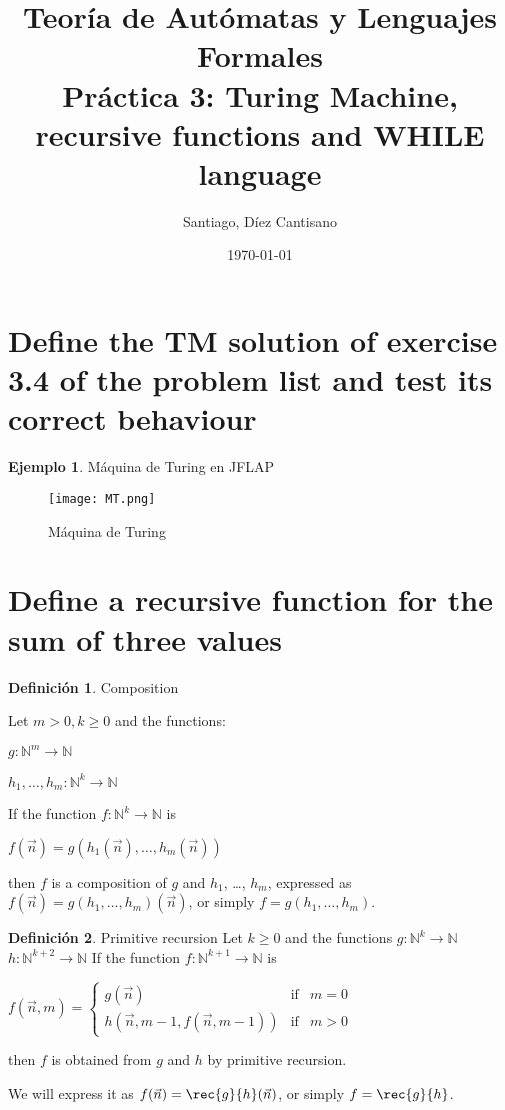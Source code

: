 \documentclass{article}
\title{Teoría de Autómatas y Lenguajes Formales\\[.4\baselineskip]Práctica 3: Turing Machine, recursive functions and WHILE language}
\author{Santiago, Díez Cantisano}
\date{\today}
\theoremstyle{plain}
\theoremstyle{definition}
\newtheorem{definition}{Definición}[section]
\newtheorem{example}{Ejemplo}[section]
\begin{document}
\maketitle

\section{Define the TM solution of exercise 3.4 of the problem list and test its correct behaviour}

\begin{example}
Máquina de Turing en JFLAP
\begin{figure}
    \centering
    \texttt{[image: MT.png]}
    \caption{Máquina de Turing}
    \label{fig:my_label}
\end{figure}
\end{example}

\newpage
\section{Define a recursive function for the sum of three values}

\begin{definition}{Composition }

Let $m>0, k\geq0 $ and the functions: 

$g:\mathbb{N}^m \to \mathbb{N}$

$h_1, \dots, h_m: \mathbb{N}^k \to \mathbb{N}$

If the function $f:\mathbb{N}^k\to \mathbb{N}$ is
\begin{center}
    $f(\vec{n})=g(h_1(\vec{n}), \dots, h_m(\vec{n})) $
\end{center}
then $f$ is a composition of $g$ and $h_1$, \dots, $h_m$, 
expressed as $f(\vec{n})=g(h_1, \dots, h_m)(\vec{n})$, or simply $f=g(h_1, \dots, h_m)$.
\end{definition}

\begin{definition}{Primitive recursion }
\newline Let $k\geq 0$ and the functions
\newline $g:\mathbb{N}^k \to \mathbb{N}$
\newline $h:\mathbb{N}^{k+2} \to \mathbb{N}$
\newline If the function $f:\mathbb{N}^{k+1} \to \mathbb{N}$ is
\begin{center}
    $f(\vec{n},m)=\left\{ 
\begin{array}{lcc}
    g(\vec{n})                          & \text{if} & m=0\\
    h(\vec{n},m-1,f(\vec{n},m-1)) & \text{if} & m>0 
\end{array}\right.$
\end{center}

then $f$ is obtained from $g$ and $h$ by primitive recursion.

We will express it as $f(\vec{n})=\rec{g}{h}(\vec{n})$, or simply $f=\rec{g}{h}$.
\end{definition}
\end{document}
